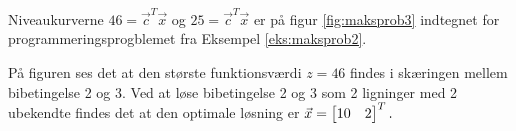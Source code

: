 \begin{eks}
Niveaukurverne $46=\vec{c}^T \vec{x}$ og $25=\vec{c}^T \vec{x}$ er på figur \ref{fig:maksprob3} indtegnet for programmeringsprogblemet fra Eksempel \ref{eks:maksprob2}.

	\begin{center}	
		
		\label{fig:maksprob3}
	\end{center}
	
På figuren ses det at den største funktionsværdi $z=46$ findes i skæringen mellem bibetingelse 2 og 3.
Ved at løse bibetingelse 2 og 3 som 2 ligninger med 2 ubekendte findes det at den optimale løsning er $\vec{x}=\begin{bmatrix} 10 & 2 \end{bmatrix}^T.$
\label{eks:maksprob3}
\end{eks}


\begin{comment}
Stadig to do i afsnittet\\
- Hvis der findes en løsning, findes der en optimal løsning (med evt. bevis. burde ikke være så svært med modstrid)\\

Skal jeg have det med at løsninger findes i hjørner? det virker til at kræve en smule mere geometri og hører nok bedre til i geometri afsnittet.
\end{comment}
